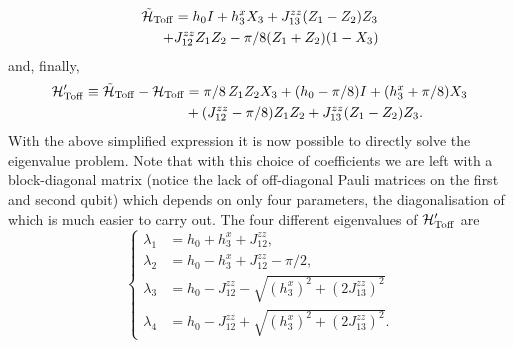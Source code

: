 \begin{equation}
\begin{aligned}
    \tilde{\mathcal{H}}_{\operatorname{Toff}} &= h_0 I + h_3^x X_3 + J_{13}^{zz}(Z_1 - Z_2)Z_3 \\
   +& J_{12}^{zz} Z_1 Z_2 - \pi/8 ( Z_1 +  Z_2)(1 - X_3)
\end{aligned}
\end{equation}
and, finally,
\begin{equation}
\begin{aligned}
	\mathcal{H}'_{\operatorname{Toff}}{}\equiv \tilde{\mathcal{H}}_{\operatorname{Toff}}-\mathcal{H}_{\operatorname{Toff}} &=
		\pi/8\, Z_1 Z_2 X_3 + (h_0 - \pi/8)I
		+ (h_3^x + \pi/8) X_3 \\
		&+ (J_{12}^{zz} - \pi/8) Z_1 Z_2 +
		J_{13}^{zz} (Z_1 - Z_2)Z_3.
\end{aligned}
\label{eq:toffoli_HPrime_reduced}
\end{equation}
With the above simplified expression it is now possible to directly solve the eigenvalue problem. Note that with this choice of coefficients we are left with a block-diagonal matrix (notice the lack of off-diagonal Pauli matrices on the first and second qubit) which depends on only four parameters, the diagonalisation of which is much easier to carry out.
The four different eigenvalues of $\mathcal{H}'_{\operatorname{Toff}}{}$ are
\begin{equation}
\begin{cases}
    \lambda_1 &= h_0 + h_3^x + J_{12}^{zz}, \\
    \lambda_2 &= h_0 - h_3^x + J_{12}^{zz} - \pi/2, \\
    \lambda_3 &= h_0 - J_{12}^{zz}
                - \sqrt{(h_3^x)^2+ (2J_{13}^{zz})^2}\\
    \lambda_4 &= h_0 - J_{12}^{zz}
                + \sqrt{(h_3^x)^2+ (2J_{13}^{zz})^2}.
\end{cases}
\end{equation}

